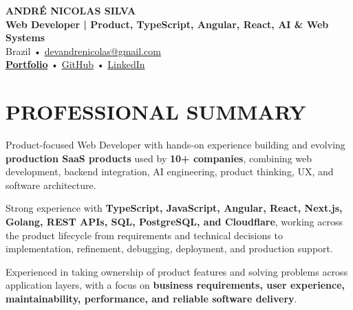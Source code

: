 \documentclass[10pt,a4paper]{article}
\begin{document}

\begin{center}

    {\LARGE \textbf{ANDRÉ NICOLAS SILVA}} \\[-2pt]

    {\normalsize \textbf{Web Developer | Product, TypeScript, Angular, React, AI \& Web Systems}} \\[1pt]

    \footnotesize
    Brazil \quad • \quad
    \href{mailto:devandrenicolas@gmail.com}{devandrenicolas@gmail.com} \\[-1pt]

    \textbf{\href{https://portfolio-andrenicolas.vercel.app}{Portfolio}}
    \quad • \quad
    \href{https://github.com/devAndreNicolas}{GitHub}
    \quad • \quad
    \href{https://www.linkedin.com/in/devandrenicolas}{LinkedIn}

\end{center}

\vspace{-3pt}


\section*{PROFESSIONAL SUMMARY}

\footnotesize

Product-focused Web Developer with hands-on experience building and
evolving \textbf{production SaaS products} used by \textbf{10+ companies},
combining web development, backend integration, AI engineering,
product thinking, UX, and software architecture.

Strong experience with \textbf{TypeScript, JavaScript, Angular, React,
Next.js, Golang, REST APIs, SQL, PostgreSQL, and Cloudflare},
working across the product lifecycle from requirements and technical
decisions to implementation, refinement, debugging, deployment,
and production support.

Experienced in taking ownership of product features and solving
problems across application layers, with a focus on
\textbf{business requirements, user experience, maintainability,
performance, and reliable software delivery}.
\end{document}
